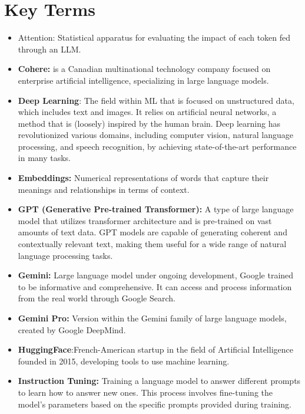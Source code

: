 \chapter*{Key Terms}

\begin{itemize}
 \item Attention: Statistical apparatus for evaluating the impact of each token fed through an LLM.
\item \textbf{Cohere:} is a Canadian multinational technology company focused on enterprise artificial intelligence, specializing in large language models.
\item \textbf{Deep Learning}: The field within ML that is focused on unstructured data, which includes text and images. It relies on artificial neural networks, a method that is (loosely) inspired by the human brain. Deep learning has revolutionized various domains, including computer vision, natural language processing, and speech recognition, by achieving state-of-the-art performance in many tasks.

\item \textbf{Embeddings:} Numerical representations of words that capture their meanings and relationships in terms of context.

\item \textbf{GPT (Generative Pre-trained Transformer):} A type of large language model that utilizes transformer architecture and is pre-trained on vast amounts of text data. GPT models are capable of generating coherent and contextually relevant text, making them useful for a wide range of natural language processing tasks.

\item \textbf{Gemini:} Large language model under ongoing development, Google trained to be informative and comprehensive. It can access and process information from the real world through Google Search.

\item \textbf{Gemini Pro:} Version within the Gemini family of large language models, created by Google DeepMind.
\item \textbf{HuggingFace}:French-American startup in the field of Artificial Intelligence founded in 2015, developing tools to use machine learning.

\item \textbf{Instruction Tuning:} Training a language model to answer different prompts to learn how to answer new ones. This process involves fine-tuning the model's parameters based on the specific prompts provided during training.


\end{itemize}
